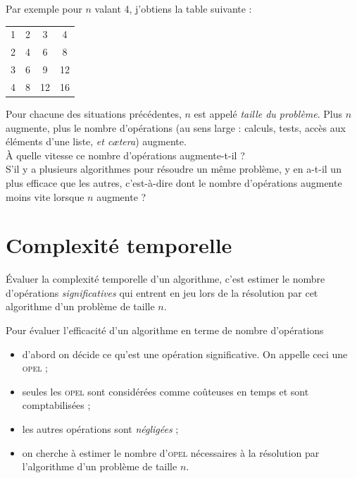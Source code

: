     Par exemple pour $n$ valant 4, j'obtiens la table suivante :
    \begin{center}
    \tabularstyled
    \begin{tabular}{c|c|c|c}
    1 & 2 & 3 & 4\\
    2 & 4 & 6 & 8 \\
    3 & 6 & 9 & 12 \\
    4 & 8 & 12 & 16            
    \end{tabular}
    \end{center}


Pour chacune des situations précédentes, $n$ est appelé \textit{taille du problème}. Plus $n$ augmente, plus le nombre d'opérations (au sens large : calculs, tests, accès aux éléments d'une liste, \textit{et cætera}) augmente.\\

À quelle vitesse ce nombre d'opérations augmente-t-il ?\\

S'il y a plusieurs algorithmes pour résoudre un même problème, y en a-t-il un plus efficace que les autres, c'est-à-dire dont le nombre d'opérations augmente moins vite lorsque $n$ augmente ?

\section{Complexité temporelle}

Évaluer la complexité temporelle d'un algorithme, c'est estimer le nombre d'opérations \textit{significatives} qui entrent en jeu lors de la résolution par cet algorithme d'un problème de taille $n$. 

\begin{methode}
Pour évaluer l'efficacité d'un algorithme en terme de nombre d'opérations
\begin{itemize}
   \item    d'abord on décide ce qu'est une opération significative. On appelle ceci une \textsc{opel} ; 
   \item    seules les \textsc{opel} sont considérées comme coûteuses en temps et sont comptabilisées ;
   \item    les autres opérations sont \textit{négligées} ;
   \item    on cherche à estimer le nombre d'\textsc{opel} nécessaires à la résolution par l'algorithme d'un problème de taille $n$. 
\end{itemize}
\end{methode}                                   


